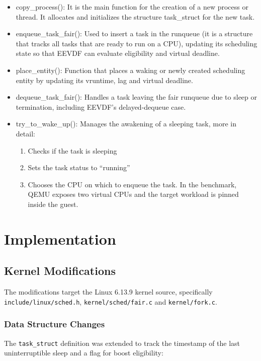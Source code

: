 \documentclass[11pt, a4paper]{article}
\begin{document}
    \begin{itemize}
        \item copy\_process():  It is the main function for the creation of a new process or thread.
                                It allocates and initializes the structure task\_struct for the new task.

        \item enqueue\_task\_fair():    Used to insert a task in the runqueue (it is a structure that tracks all tasks that are ready to run on a CPU),
                                        updating its scheduling state so that EEVDF can evaluate eligibility and virtual deadline.

        \item place\_entity():          Function that places a waking or newly created scheduling entity by updating its vruntime, lag and virtual deadline.

        \item dequeue\_task\_fair(): Handles a task leaving the fair runqueue due to sleep or termination, including EEVDF's delayed-dequeue case.

        \item try\_to\_wake\_up(): Manages the awakening of a sleeping task, more in detail:
            \begin{enumerate}
                \item Checks if the task is sleeping
                \item Sets the task status to “running”
                \item Chooses the CPU on which to enqueue the task. In the benchmark, QEMU exposes two virtual CPUs and the target workload is pinned inside the guest.
            \end{enumerate}
        \end{itemize}
\section{Implementation}

\subsection{Kernel Modifications}
The modifications target the Linux 6.13.9 kernel source, specifically \texttt{include/linux/sched.h}, \texttt{kernel/sched/fair.c} and \texttt{kernel/fork.c}.

\subsubsection{Data Structure Changes}
The \texttt{task\_struct} definition was extended to track the timestamp of the last uninterruptible sleep and a flag for boost eligibility:
\end{document}
